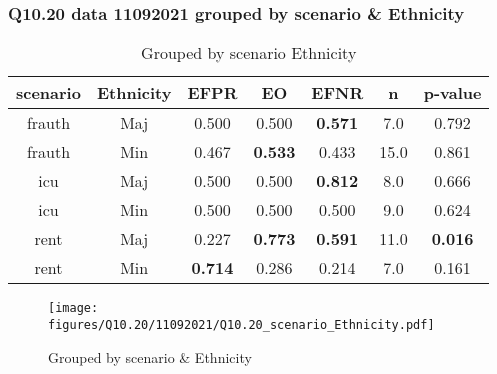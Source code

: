 \subsubsection{Q10.20 data 11092021 grouped by scenario \& Ethnicity}

\begin{comment}
                   EFPR        EO      EFNR     n    pvalue
(frauth, Maj)  0.500000  0.500000  0.571429   7.0  0.791676
(frauth, Min)  0.466667  0.533333  0.433333  15.0  0.860520
(icu, Maj)     0.500000  0.500000  0.812500   8.0  0.666228
(icu, Min)     0.500000  0.500000  0.500000   9.0  0.623772
(rent, Maj)    0.227273  0.772727  0.590909  11.0  0.015680
(rent, Min)    0.714286  0.285714  0.214286   7.0  0.160530
\end{comment}

\begin{table}[h]
    \centering
    \begin{tabular}{|c|c|c|c|c|c|c|}
        \hline
        scenario & Ethnicity & EFPR & EO & EFNR & n & p-value\\
        \hline
        frauth & Maj & 0.500 & 0.500 & \textbf{0.571} & 7.0 & 0.792\\
		frauth & Min & 0.467 & \textbf{0.533} & 0.433 & 15.0 & 0.861\\
		icu & Maj & 0.500 & 0.500 & \textbf{0.812} & 8.0 & 0.666\\
		icu & Min & 0.500 & 0.500 & 0.500 & 9.0 & 0.624\\
		rent & Maj & 0.227 & \textbf{0.773} & \textbf{0.591} & 11.0 & \textbf{0.016}\\
		rent & Min & \textbf{0.714} & 0.286 & 0.214 & 7.0 & 0.161\\
		
        \hline
    \end{tabular}
    \caption{Grouped by scenario Ethnicity}
    \label{tab:my_label}
\end{table}
\begin{figure}[h]
    \centering
    \texttt{[image: figures/Q10.20/11092021/Q10.20\_scenario\_Ethnicity.pdf]}
    \caption{Grouped by scenario \& Ethnicity}
    \label{fig:my_label}
\end{figure}
